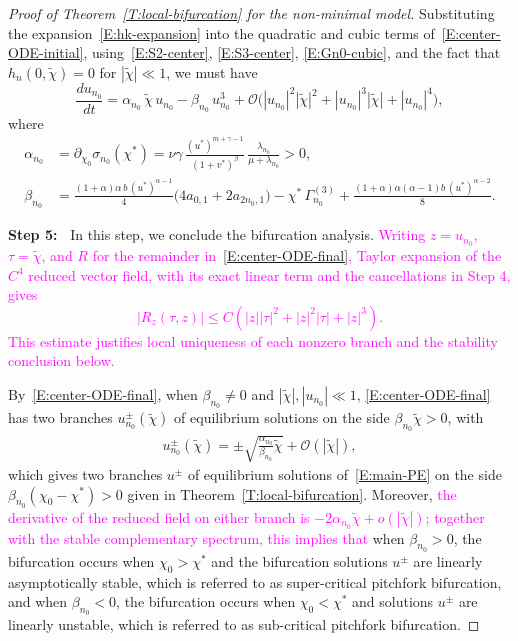 \documentclass[11pt]{article} %
\theoremstyle{remark}
\theoremstyle{remark}
\numberwithin{equation}{section}
\numberwithin{figure}{section}
\numberwithin{table}{section}
\begin{document}
\begin{proof}[Proof of Theorem~\ref{T:local-bifurcation}  for the non-minimal model]
  Substituting the expansion~\eqref{E:hk-expansion} into the quadratic and cubic
  terms of~\eqref{E:center-ODE-initial}, using~\eqref{E:S2-center},
  \eqref{E:S3-center}, \eqref{E:Gn0-cubic}, and the fact that
  $h_{n}(0,\tilde{\chi}) = 0$ for $|\tilde{\chi}|\ll 1$, we must have
  \begin{equation}\label{E:center-ODE-final}
    \frac{d u_{n_0}}{dt}
    = \alpha_{n_0}\,\tilde{\chi}\,u_{n_0}
    - \beta_{n_0}\,u_{n_0}^3
    + { \mathcal{O}\Big( |u_{n_0}|^{{2}} |\tilde{\chi}|^2+ {|u_{n_0}|^3}
    |\tilde{\chi}|+ |u_{n_0}|^4\Big),}
  \end{equation}
  where
  \begin{align}\label{E:alpha_n0}
    \alpha_{n_0}  & = \partial_{\chi_0}\sigma_{n_0}(\chi^*)
    = \nu\gamma\,\frac{(u^*)^{m+\gamma-1}}{(1+v^*)^\beta}\,
    \frac{\lambda_{n_0}}{\mu+\lambda_{n_0}}
    > 0, \\
    \beta_{n_0}
    & = \frac{(1+\alpha)\alpha\,b\,(u^*)^{\alpha-1}}{4}
    \bigl(4a_{0,1} + 2a_{2n_0,1}\bigr)
    - \chi^*\,\Gamma_{n_0}^{(3)}
    + \frac{(1+\alpha)\alpha(\alpha-1)b\,(u^*)^{\alpha-2}}{8}.
    \label{E:beta-n0}
  \end{align}


  \noindent\textbf{Step 5:~} In this step, we conclude the bifurcation analysis.
  \textcolor{magenta}{Writing $z=u_{n_0}$, $\tau=\widetilde{\chi}$, and $R$ for the remainder in~\eqref{E:center-ODE-final}, Taylor expansion of the $C^4$ reduced vector field, with its exact linear term and the cancellations in Step 4, gives
  \[
    |R_z(\tau,z)|\le C\left(|z||\tau|^2+|z|^2|\tau|+|z|^3\right).
  \]
  This estimate justifies local uniqueness of each nonzero branch and the stability conclusion below.}

  \smallskip

  By~\eqref{E:center-ODE-final}, when $\beta_{n_0} \ne
  0$ and $|\tilde\chi|, |u_{n_0}|\ll 1$, \eqref{E:center-ODE-final} has two branches $u_{n_0}^\pm(\tilde{\chi})$ of
  equilibrium solutions on the side $\beta_{n_0}\widetilde{\chi} > 0$, with
  \begin{align}\label{E:two-branches}
    u_{n_0}^\pm(\widetilde{\chi})
    =\pm\sqrt{\frac{\alpha_{n_0}}{\beta_{n_0}}
    \widetilde{\chi}}+\mathcal{O}(|\widetilde{\chi}|),
  \end{align}
  which gives two branches $u^\pm$ of equilibrium solutions of~\eqref{E:main-PE}
  on the side $\beta_{n_0} (\chi_0 - \chi^*) > 0$ given in
  Theorem~\ref{T:local-bifurcation}. Moreover, \textcolor{magenta}{the derivative of the reduced field on either branch is $-2\alpha_{n_0}\widetilde{\chi}+o(|\widetilde{\chi}|)$; together with the stable complementary spectrum, this implies that}
  when $\beta_{n_0} > 0$, the bifurcation occurs when $\chi_0 > \chi^*$ and the
  bifurcation solutions $u^\pm$ are linearly asymptotically stable, which is
  referred to as super-critical pitchfork bifurcation, and when $\beta_{n_0} <
  0$, the bifurcation occurs when $\chi_0 < \chi^*$ and solutions $u^\pm$ are
  linearly unstable, which is referred to as sub-critical pitchfork bifurcation.
\end{proof}
\end{document}
